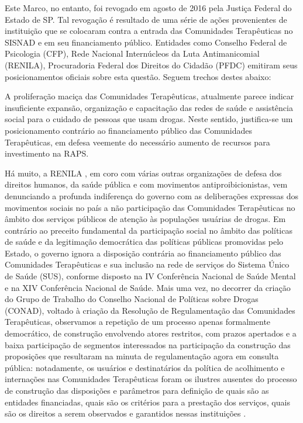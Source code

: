 \documentclass[
	12pt,				%
	oneside,			%
	a4paper,			%
	sumario=tradicional,
	english,			%
	brazil				%
	]{abntex2}
\begin{document}
Este Marco, no entanto, foi revogado em agosto de 2016 pela Justiça Federal do Estado de SP. Tal revogação é resultado de uma série de ações provenientes de instituição que se colocaram contra a entrada das Comunidades Terapêuticas no SISNAD e em seu financiamento público. Entidades como Conselho Federal de Psicologia (CFP), Rede Nacional Internúcleos da Luta Antimanicomial (RENILA), Procuradoria Federal dos Direitos do Cidadão (PFDC) emitiram seus posicionamentos oficiais sobre esta questão. Seguem trechos destes abaixo:
\begin{quoting}[rightmargin=0cm,leftmargin=4cm]
\begin{singlespace}
{\footnotesize 
A proliferação maciça das Comunidades Terapêuticas, atualmente parece indicar insuficiente expansão, organização e capacitação das redes de saúde e assistência social para o cuidado de pessoas que usam drogas. Neste sentido, justifica-se um posicionamento contrário ao financiamento público das Comunidades Terapêuticas, em defesa veemente do necessário aumento de recursos para investimento na RAPS. \cite[p.03]{cfp2014}}
\end{singlespace}
\end{quoting}
\begin{quoting}[rightmargin=0cm,leftmargin=4cm]
\begin{singlespace}
{\footnotesize
Há muito, a RENILA , em coro com várias outras organizações de defesa dos direitos humanos, da saúde pública e com movimentos antiproibicionistas, vem denunciando a profunda indiferença do governo com as deliberações expressas dos movimentos sociais no país a não participação das Comunidades Terapêuticas no âmbito dos serviços públicos de atenção às populações usuárias de drogas. Em contrário ao preceito fundamental da participação social no âmbito das políticas de saúde e da legitimação democrática das políticas públicas promovidas pelo Estado, o governo ignora a disposição contrária ao financiamento público das Comunidades Terapêuticas e sua inclusão na rede de serviços do Sistema Único de Saúde (SUS), conforme disposto na IV Conferência Nacional de Saúde Mental e na XIV Conferência Nacional de Saúde. Mais uma vez, no decorrer da criação do Grupo de Trabalho do Conselho Nacional de Políticas sobre Drogas (CONAD), voltado à criação da Resolução de Regulamentação das Comunidades Terapêuticas, observamos a repetição de um processo apenas formalmente democrático, de construção envolvendo atores restritos, com prazos apertados e a baixa participação de segmentos interessados na participação da construção das proposições que resultaram na minuta de regulamentação agora em consulta pública: notadamente, os usuários e destinatários da política de acolhimento e internações nas Comunidades Terapêuticas foram os ilustres ausentes do processo de construção das disposições e parâmetros para definição de quais são as entidades financiadas, quais são os critérios para a prestação dos serviços, quais são os direitos a serem observados e garantidos nessas instituições \cite[p. 01]{renila2014}.}
\end{singlespace}
\end{quoting}
\end{document}
